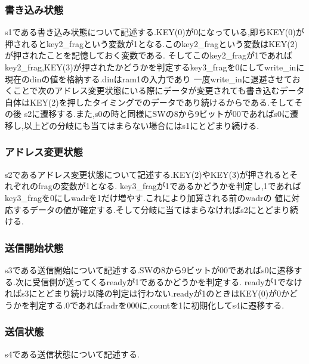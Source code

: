\documentclass[dvipdfmx]{jarticle}
\begin{document}
\subsubsection{書き込み状態}
s1である書き込み状態について記述する.KEY(0)が0になっている,即ちKEY(0)が押されるとkey2\_fragという変数が1となる.このkey2\_fragという変数はKEY(2)が押されたことを記憶しておく変数である.
そしてこのkey2\_fragが1であればkey2\_frag,KEY(3)が押されたかどうかを判定するkey3\_fragを0にしてwrite\_inに現在のdinの値を格納する.dinはram1の入力であり
一度write\_inに退避させておくことで次のアドレス変更状態にいる際にデータが変更されても書き込むデータ自体はKEY(2)を押したタイミングでのデータであり続けるからである.そしてその後
s2に遷移する.また,s0の時と同様にSWの8から9ビットが00であればs0に遷移し,以上どの分岐にも当てはまらない場合にはs1にとどまり続ける.

\subsubsection{アドレス変更状態}
s2であるアドレス変更状態について記述する.KEY(2)やKEY(3)が押されるとそれぞれのfragの変数が1となる.
key3\_fragが1であるかどうかを判定し,1であればkey3\_fragを0にしwadrを1だけ増やす.これにより加算される前のwadrの
値に対応するデータの値が確定する.そして分岐に当てはまらなければs2にとどまり続ける.
\subsubsection{送信開始状態}
s3である送信開始について記述する.SWの8から9ビットが00であればs0に遷移する.次に受信側が送ってくるreadyが1であるかどうかを判定する.
readyが1でなければs3にとどまり続け以降の判定は行わない.readyが1のときはKEY(0)が0かどうかを判定する.0であればradrを000に,countを1に初期化してs4に遷移する.
\subsubsection{送信状態}
s4である送信状態について記述する.
\end{document}
